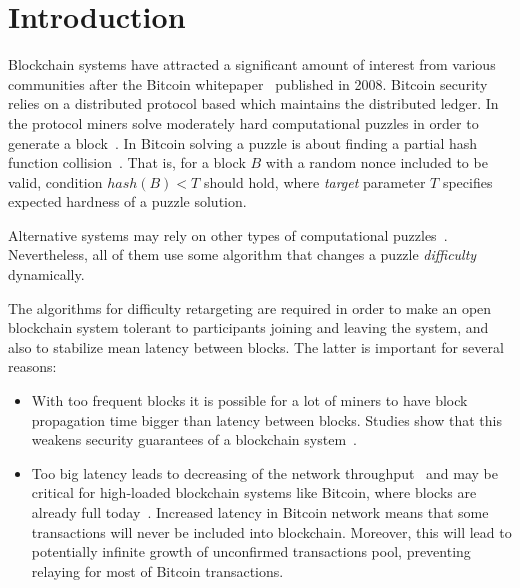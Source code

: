 \documentclass[]{llncs}
\begin{document}
\section{Introduction}
\label{sec:intro}

Blockchain systems have attracted a significant amount of interest from various communities after the Bitcoin whitepaper~\cite{Nakamoto2008} published in 2008.
Bitcoin security relies on a distributed protocol based which maintains the distributed ledger. In the protocol miners solve moderately hard computational puzzles in order to generate a block~\cite{}. In Bitcoin solving a puzzle is about finding a partial hash function collision~\cite{}. That is, for a block $B$ with a random nonce included to be valid, condition $hash(B) < T$ should hold, where {\em target} parameter $T$ specifies expected hardness of a puzzle solution.

Alternative systems may rely on other types of computational puzzles~\cite{??}. Nevertheless, all of them use some algorithm that changes a puzzle {\em difficulty} dynamically.

The algorithms for difficulty retargeting are required in order to make an open blockchain system tolerant to participants joining and leaving the system, and also to stabilize mean latency between blocks. The latter is important for several reasons:

\begin{itemize}
\item{With too frequent blocks it is possible for a lot of miners to have block propagation time bigger than latency between blocks. Studies show that this weakens security guarantees of a blockchain system~\cite{decker2013information,garay2015bitcoin}.}

\item{Too big latency leads to decreasing of the network throughput~\cite{miller2016} and may be critical for high-loaded blockchain systems like Bitcoin, where blocks are already full today~\cite{armstrong2016}. Increased latency in Bitcoin network means that some transactions will never be included into blockchain. Moreover, this will lead to potentially infinite growth of unconfirmed transactions pool, preventing relaying for most of Bitcoin transactions.}
\end{itemize}
\end{document}
